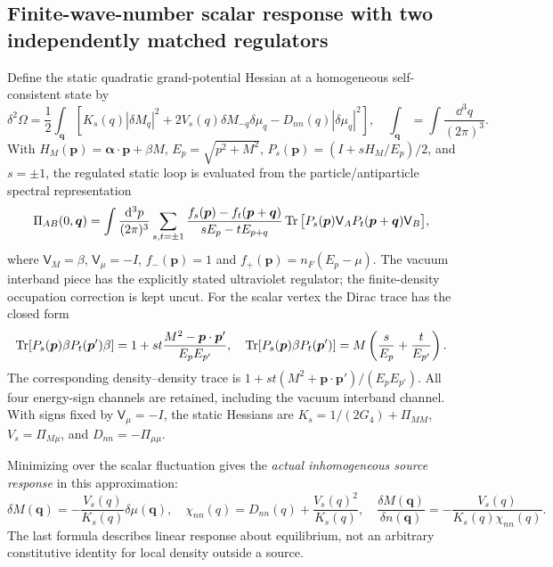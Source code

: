 \documentclass[11pt,a4paper]{article}
\begin{document}
\subsection{Finite-wave-number scalar response with two independently matched regulators}
Define the static quadratic grand-potential Hessian at a homogeneous self-consistent state by
\begin{equation}\label{eq:qm009-quadratic}
\delta^2\Omega=\frac12\int_{\bm q}\left[K_s(q)|\delta M_q|^2
+2V_s(q)\delta M_{-q}\delta\mu_q
-D_{nn}(q)|\delta\mu_q|^2\right],
\quad \int_{\bm q}=\int\frac{\dd^3q}{(2\pi)^3}.
\end{equation}
With $H_M(\bm p)=\bm\alpha\cdot\bm p+\beta M$, $E_p=\sqrt{p^2+M^2}$, $P_s(\bm p)=(I+sH_M/E_p)/2$, and $s=\pm1$, the regulated static loop is evaluated from the particle/antiparticle spectral representation
\begin{equation}\label{eq:qm009-loop}
\Pi_{AB}(0,\bm q)=\int\frac{\mathrm d^3p}{(2\pi)^3}\sum_{s,t=\pm1}
\frac{f_s(\bm p)-f_t(\bm p+\bm q)}{sE_p-tE_{p+q}}
\operatorname{Tr}\big[P_s(\bm p)\mathsf V_A P_t(\bm p+\bm q)\mathsf V_B\big],
\end{equation}
where $\mathsf V_M=\beta$, $\mathsf V_\mu=-I$, $f_-(\bm p)=1$ and $f_+(\bm p)=n_F(E_p-\mu)$. The vacuum interband piece has the explicitly stated ultraviolet regulator; the finite-density occupation correction is kept uncut. For the scalar vertex the Dirac trace has the closed form
\begin{equation}\label{eq:qm009-traces}
\operatorname{Tr}[P_s(\bm p)\beta P_t(\bm p')\beta]
=1+st\frac{M^2-\bm p\cdot\bm p'}{E_pE_{p'}},\quad
\operatorname{Tr}[P_s(\bm p)\beta P_t(\bm p')]=M\left(\frac{s}{E_p}+\frac{t}{E_{p'}}\right).
\end{equation}
The corresponding density--density trace is $1+st(M^2+\bm p\cdot\bm p')/(E_pE_{p'})$. All four energy-sign channels are retained, including the vacuum interband channel. With signs fixed by $\mathsf V_\mu=-I$, the static Hessians are $K_s=1/(2G_4)+\Pi_{MM}$, $V_s=\Pi_{M\mu}$, and $D_{nn}=-\Pi_{\mu\mu}$.

Minimizing over the scalar fluctuation gives the \emph{actual inhomogeneous source response} in this approximation:
\begin{equation}\label{eq:qm009-response}
\boxed{\delta M(\bm q)=-\frac{V_s(q)}{K_s(q)}\delta\mu(\bm q),\quad
 \chi_{nn}(q)=D_{nn}(q)+\frac{V_s(q)^2}{K_s(q)},\quad
 \frac{\delta M(\bm q)}{\delta n(\bm q)}=-\frac{V_s(q)}{K_s(q)\chi_{nn}(q)}.}
\end{equation}
The last formula describes linear response about equilibrium, not an arbitrary constitutive identity for local density outside a source.
\end{document}
